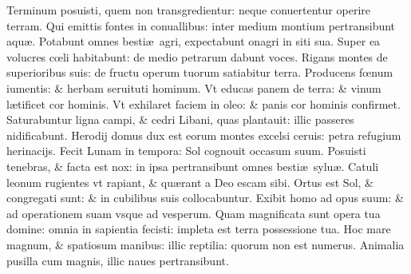 \documentclass[a5paper,10pt]{book}
\def\ae{æ}
\def\oe{œ}
\begin{document}
\begin{multicols*}{2}
\newline \color{red} T\color{black}erminum posuisti, quem non transgredientur: neque conuertentur operire terram.
\newline \color{red} Q\color{black}ui emittis fontes in conuallibus: inter medium montium pertransibunt aqu\ae .
\newline \color{red} P\color{black}otabunt omnes besti\ae \ agri, expectabunt onagri in siti sua.
\newline \color{red} S\color{black}uper ea volucres c\oe li habitabunt: de medio petrarum dabunt voces.
\newline \color{red} R\color{black}igans montes de superioribus suis: de fructu operum tuorum satiabitur terra.
\newline \color{red} P\color{black}roducens f\oe num iumentis: \& herbam seruituti hominum.
\newline \color{red} V\color{black}t educas panem de terra: \& vinum l\ae tificet cor hominis.
\newline \color{red} V\color{black}t exhilaret faciem in oleo: \& panis cor hominis confirmet.
\newline \color{red} S\color{black}aturabuntur ligna campi, \& cedri Libani, quas plantauit: illic passeres nidificabunt.
\newline \color{red} H\color{black}erodij domus dux est eorum montes excelsi ceruis: petra refugium herinacijs.
\newline \color{red} F\color{black}ecit Lunam in tempora: Sol cognouit occasum suum.
\newline \color{red} P\color{black}osuisti tenebras, \& facta est nox: in ipsa pertransibunt omnes besti\ae \ sylu\ae .
\newline \color{red} C\color{black}atuli leonum rugientes vt rapiant, \& qu\ae rant a Deo escam sibi.
\newline \color{red} O\color{black}rtus est Sol, \& congregati sunt: \& in cubilibus suis collocabuntur.
\newline \color{red} E\color{black}xibit homo ad opus suum: \& ad operationem suam vsque ad vesperum.
\newline \color{red} Q\color{black}uam magnificata sunt opera tua domine: omnia in sapientia fecisti: impleta est terra possessione tua.
\newline \color{red} H\color{black}oc mare magnum, \& spatiosum manibus: illic reptilia: quorum non est numerus.
\newline \color{red} A\color{black}nimalia pusilla cum magnis, illic naues pertransibunt.

\end{multicols*}
\end{document}
